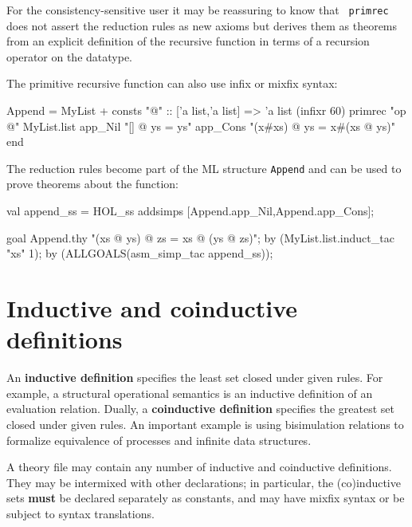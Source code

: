 For the consistency-sensitive user it may be reassuring to know that {\tt
  primrec} does not assert the reduction rules as new axioms but derives them
as theorems from an explicit definition of the recursive function in terms of
a recursion operator on the datatype.

The primitive recursive function can also use infix or mixfix syntax:
\begin{ttbox}
Append = MyList +
consts "@"  :: ['a list,'a list] => 'a list  (infixr 60)
primrec "op @" MyList.list
   app_Nil   "[] @ ys = ys"
   app_Cons  "(x#xs) @ ys = x#(xs @ ys)"
end
\end{ttbox}

The reduction rules become part of the ML structure \verb$Append$ and can
be used to prove theorems about the function:
\begin{ttbox}
val append_ss = HOL_ss addsimps [Append.app_Nil,Append.app_Cons];

goal Append.thy "(xs @ ys) @ zs = xs @ (ys @ zs)";
by (MyList.list.induct_tac "xs" 1);
by (ALLGOALS(asm_simp_tac append_ss));
\end{ttbox}




\section{Inductive and coinductive definitions}

An {\bf inductive definition} specifies the least set closed under given
rules.  For example, a structural operational semantics is an inductive
definition of an evaluation relation.  Dually, a {\bf coinductive
  definition} specifies the greatest set closed under given rules.  An
important example is using bisimulation relations to formalize equivalence
of processes and infinite data structures.

A theory file may contain any number of inductive and coinductive
definitions.  They may be intermixed with other declarations; in
particular, the (co)inductive sets {\bf must} be declared separately as
constants, and may have mixfix syntax or be subject to syntax translations.

